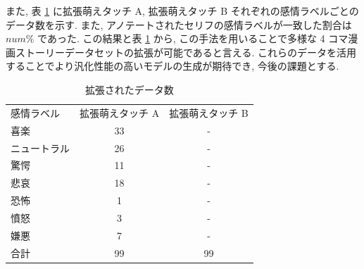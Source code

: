 \begin{table}[!h]
\vspace{10mm}
\caption{アノテートされたセリフと感情ラベルの例}
\label{table:aug_data}
\centering
{}
\vspace{1mm}
\end{table}

\newpage
また, 表 \ref{table:data_moe_aug} に拡張萌えタッチ A, 拡張萌えタッチ B それぞれの感情ラベルごとのデータ数を示す. また, アノテートされたセリフの感情ラベルが一致した割合は $num \%$ であった. この結果と表 \ref{table:data_moe_aug} から, この手法を用いることで多様な 4 コマ漫画ストーリーデータセットの拡張が可能であると言える. これらのデータを活用することでより汎化性能の高いモデルの生成が期待でき, 今後の課題とする.


\begin{table}[!h]
\vspace{20mm}
\begin{center}
\caption{拡張されたデータ数} %
\label{table:data_moe_aug} %
\begin{tabular}{lcc}
\hline
\multirow{2}{*}{感情ラベル} & \multirow{2}{*}{拡張萌えタッチ A} & \multirow{2}{*}{拡張萌えタッチ B} \\
 &  &  \\ \hline
喜楽 & 33 & - \\ \hline
ニュートラル & 26 & - \\
驚愕 & 11 & - \\
悲哀 & 18 & - \\
恐怖 & 1 & - \\
憤怒 & 3 & - \\
嫌悪 & 7 & - \\ \hline
合計 & 99 & 99
\end{tabular}
\end{center}
\vspace{10mm}
\end{table}

